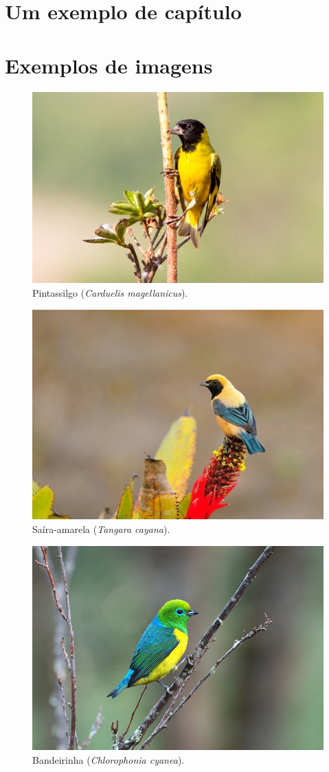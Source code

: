 \documentclass[
	10pt,				%
	openright,			%
	twoside,			%
	a5paper,			%
	english,			%
	french,				%
	spanish,			%
	brazil,				%
]{abntex2}
\begin{document}
\chapter{Um exemplo de capítulo}

\lipsum[1-10]

\chapter{Exemplos de imagens}

\lipsum[1-5]

\begin{figure}
\centering
\includegraphics[width=0.6\linewidth]{pintassilgo}
\caption{Pintassilgo (\textit{Carduelis magellanicus}).}
\label{fig:pintassilgo}
\end{figure}


\begin{figure}
\centering
\includegraphics[width=0.6\linewidth]{saira-amarela}
\caption{Saíra-amarela (\textit{Tangara cayana}).}
\label{fig:saira-amarela}
\end{figure}

\begin{figure}
\centering
\includegraphics[width=0.6\linewidth]{bandeirinha}
\caption{Bandeirinha (\textit{Chlorophonia cyanea}).}
\label{fig:bandeirinha}
\end{figure}
\end{document}

